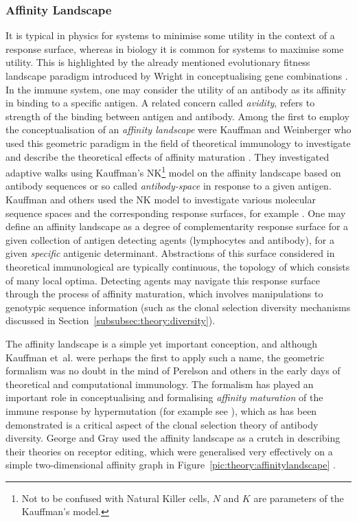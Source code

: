 %
%
\subsubsection{Affinity Landscape}
\label{subsubsec:cs:theory:affinitylandscape}
It is typical in physics for systems to minimise some utility in the context of a response surface, whereas in biology it is common for systems to maximise some utility. This is highlighted by the already mentioned evolutionary fitness landscape paradigm introduced by Wright in conceptualising gene combinations \cite{Wright1932}. In the immune system, one may consider the utility of an antibody as its affinity in binding to a specific antigen. A related concern called \emph{avidity}, refers to strength of the binding between antigen and antibody. Among the first to employ the conceptualisation of an \emph{affinity landscape} were Kauffman and Weinberger who used this geometric paradigm in the field of theoretical immunology to investigate and describe the theoretical effects of affinity maturation \cite{Kauffman1989, Kauffman1988}. They investigated adaptive walks using Kauffman's NK\footnote{Not to be confused with Natural Killer cells, $N$ and $K$ are parameters of the Kauffman's model.} model on the affinity landscape based on antibody sequences or so called \emph{antibody-space} in response to a given antigen. Kauffman and others used the NK model to investigate various molecular sequence spaces and the corresponding response surfaces, for example \cite{Farmer1986, Kauffman1993, Kauffman1987}. One may define an affinity landscape as a degree of complementarity response surface for a given collection of antigen detecting agents (lymphocytes and antibody), for a given \emph{specific} antigenic determinant. Abstractions of this surface considered in theoretical immunological are typically continuous, the topology of which consists of many local optima. Detecting agents may navigate this response surface through the process of affinity maturation, which involves manipulations to genotypic sequence information (such as the clonal selection diversity mechanisms discussed in Section~\ref{subsubsec:theory:diversity}).

The affinity landscape is a simple yet important conception, and although Kauffman et~al. were perhaps the first to apply such a name, the geometric formalism was no doubt in the mind of Perelson and others in the early days of theoretical and computational immunology. The formalism has played an important role in conceptualising and formalising \emph{affinity maturation} of the immune response by hypermutation (for example see \cite{Pierre1997, Shannon1999, Theodosopoulos2004, Theodosopoulos2005}), which as has been demonstrated is a critical aspect of the clonal selection theory of antibody diversity. George and Gray used the affinity landscape as a crutch in describing their theories on receptor editing, which were generalised very effectively on a simple two-dimensional affinity graph in Figure~\ref{pic:theory:affinitylandscape} \cite{George1999, George2000}.

